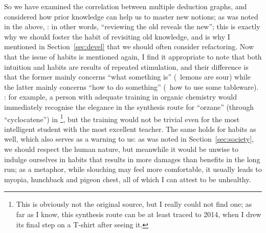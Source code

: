So we have examined the correlation between multiple deduction graphs, and
considered how prior knowledge can help us to master new notions; as was noted
in the above, : in other words, ``reviewing the old reveals the new''; this is
exactly why we should foster the habit of revisiting old knowledge, and is why I
mentioned in Section~\ref{sec:devel} that we should often consider refactoring.
Now that the issue of habits is mentioned again, I find it appropriate to note
that both intuition and habits are results of repeated stimulation, and their
difference is that the former mainly concerns ``what something is'' (\eg~lemons
are sour) while the latter mainly concerns ``how to do something'' (\eg~how to
use some tableware).  : for example, a person with
adequate training in organic chemistry would immediately recognise the elegance
in the synthesis route for ``orzane'' (through ``cyclocatene'') in \parencite%
{zxhxy2018}\footnote{This is obviously not the original source, but I really
could not find one; as far as I know, this synthesis route can be at least
traced to 2014, when I drew its final step on a T-shirt after seeing it.},
but the training would not be trivial even for the most intelligent student
with the most excellent teacher.  The same holds for habits as well, which also
serves as a warning to us: as was noted in Section~\ref{sec:society}, we should
respect the human nature, but meanwhile it would be unwise to indulge ourselves
in habits that results in more damages than benefits in the long run; as a
metaphor, while slouching may feel more comfortable, it usually leads to
myopia, hunchback and pigeon chest, all of which I can attest to be unhealthy.

